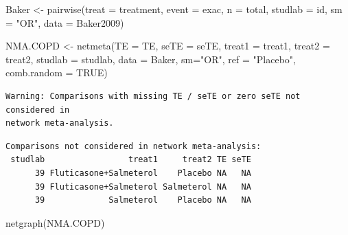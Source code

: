 \documentclass[
  letterpaper,
  DIV=11,
  numbers=noendperiod]{scrreprt}
\newenvironment{Shaded}{\begin{snugshade}}{\end{snugshade}}
\newcommand{\AttributeTok}[1]{\textcolor[rgb]{0.40,0.45,0.13}{#1}}
\newcommand{\ConstantTok}[1]{\textcolor[rgb]{0.56,0.35,0.01}{#1}}
\newcommand{\FunctionTok}[1]{\textcolor[rgb]{0.28,0.35,0.67}{#1}}
\newcommand{\NormalTok}[1]{\textcolor[rgb]{0.00,0.23,0.31}{#1}}
\newcommand{\OtherTok}[1]{\textcolor[rgb]{0.00,0.23,0.31}{#1}}
\newcommand{\StringTok}[1]{\textcolor[rgb]{0.13,0.47,0.30}{#1}}
\begin{document}
\begin{Shaded}
\begin{Highlighting}[]
\NormalTok{Baker }\OtherTok{\textless{}{-}} \FunctionTok{pairwise}\NormalTok{(}\AttributeTok{treat =}\NormalTok{ treatment,}
                  \AttributeTok{event =}\NormalTok{ exac,}
                  \AttributeTok{n =}\NormalTok{ total,}
                  \AttributeTok{studlab =}\NormalTok{ id,}
                  \AttributeTok{sm =} \StringTok{"OR"}\NormalTok{,}
                  \AttributeTok{data =}\NormalTok{ Baker2009)}

\NormalTok{NMA.COPD }\OtherTok{\textless{}{-}} \FunctionTok{netmeta}\NormalTok{(}\AttributeTok{TE =}\NormalTok{ TE, }\AttributeTok{seTE =}\NormalTok{ seTE, }\AttributeTok{treat1 =}\NormalTok{ treat1, }\AttributeTok{treat2 =}\NormalTok{ treat2,}
                    \AttributeTok{studlab =}\NormalTok{ studlab, }\AttributeTok{data =}\NormalTok{ Baker, }\AttributeTok{sm=}\StringTok{"OR"}\NormalTok{, }\AttributeTok{ref =} \StringTok{"Placebo"}\NormalTok{,}
                    \AttributeTok{comb.random =} \ConstantTok{TRUE}\NormalTok{)}
\end{Highlighting}
\end{Shaded}

\begin{verbatim}
Warning: Comparisons with missing TE / seTE or zero seTE not considered in
network meta-analysis.
\end{verbatim}

\begin{verbatim}
Comparisons not considered in network meta-analysis:
 studlab                 treat1     treat2 TE seTE
      39 Fluticasone+Salmeterol    Placebo NA   NA
      39 Fluticasone+Salmeterol Salmeterol NA   NA
      39             Salmeterol    Placebo NA   NA
\end{verbatim}

\begin{Shaded}
\begin{Highlighting}[]
\FunctionTok{netgraph}\NormalTok{(NMA.COPD)}
\end{Highlighting}
\end{Shaded}
\end{document}
